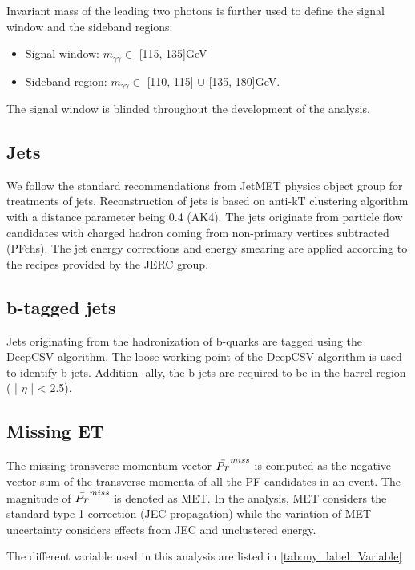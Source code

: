 Invariant mass of the leading two photons is further used to define the signal window and the sideband regions:
\begin{itemize}
    \item Signal window: $m_{\gamma\gamma} \in$ [115, 135]GeV
    \item Sideband region: $m_{\gamma\gamma} \in$ [110, 115] $\cup$ [135, 180]GeV.
\end{itemize}
The signal window is blinded throughout the development of the analysis.

\subsection{Jets}

We follow the standard recommendations from JetMET physics object group for treatments of jets. Reconstruction of jets is based on anti-kT clustering algorithm \cite{Cacciari_2008} with a distance parameter being 0.4 (AK4). The jets originate from particle flow candidates with charged hadron coming from non-primary vertices subtracted (PFchs). The jet energy corrections and energy smearing are applied according to the recipes provided by the JERC group\cite{CrossSection_5}.

\subsection{b-tagged jets}
Jets originating from the hadronization of b-quarks are tagged using the DeepCSV algorithm. The loose working point of the DeepCSV algorithm is used to identify b jets. Addition-
ally, the b jets are required to be in the barrel region ( | $\eta$ | < 2.5). 


\subsection{Missing ET}
The missing transverse momentum vector $\Bar{P_T}^ {miss}$ is computed as the negative vector sum of the transverse momenta of all the PF candidates in an event. The magnitude of $\Bar{P_T}^ {miss}$ is denoted as MET. In the analysis, MET considers the standard type 1 correction (JEC propagation) while the variation of MET uncertainty considers effects from JEC and unclustered energy.

The different variable used in this analysis are listed in \autoref{tab:my_label_Variable}

